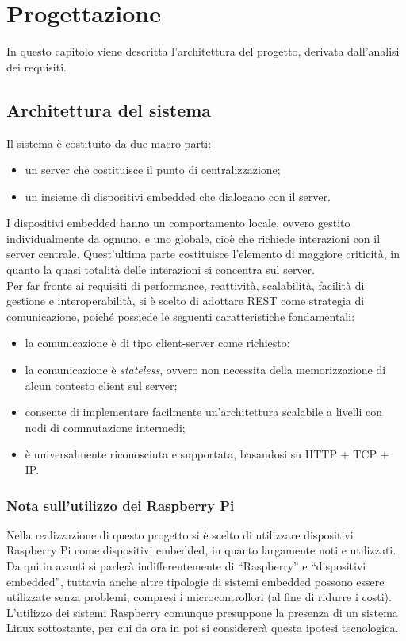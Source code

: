 \chapter{Progettazione}

In questo capitolo viene descritta l'architettura del progetto, derivata dall'analisi dei requisiti.

\section{Architettura del sistema}
Il sistema è costituito da due macro parti:
\begin{itemize}
 \item un server che costituisce il punto di centralizzazione;
 \item un insieme di dispositivi embedded che dialogano con il server.
\end{itemize}
I dispositivi embedded hanno un comportamento locale, ovvero gestito individualmente da ognuno, e uno globale, cioè che richiede interazioni con il server centrale.
Quest'ultima parte costituisce l'elemento di maggiore criticità, in quanto la quasi totalità delle interazioni si concentra sul server.
\\Per far fronte ai requisiti di performance, reattività, scalabilità, facilità di gestione e interoperabilità, si è scelto di adottare REST come strategia di comunicazione, poiché possiede le seguenti caratteristiche fondamentali:
\begin{itemize}
 \item la comunicazione è di tipo client-server come richiesto;
 \item la comunicazione è \textit{stateless}, ovvero non necessita della memorizzazione di alcun contesto client sul server;
 \item consente di implementare facilmente un'architettura scalabile a livelli con nodi di commutazione intermedi;
 \item è universalmente riconosciuta e supportata, basandosi su HTTP + TCP + IP.
\end{itemize}
\subsection{Nota sull'utilizzo dei Raspberry Pi}
Nella realizzazione di questo progetto si è scelto di utilizzare dispositivi Raspberry Pi come dispositivi embedded, in quanto largamente noti e utilizzati.
Da qui in avanti si parlerà indifferentemente di ``Raspberry'' e ``dispositivi embedded'', tuttavia anche altre tipologie di sistemi embedded possono essere utilizzate senza problemi, compresi i microcontrollori (al fine di ridurre i costi).
L'utilizzo dei sistemi Raspberry comunque presuppone la presenza di un sistema Linux sottostante, per cui da ora in poi si considererà questa ipotesi tecnologica.


